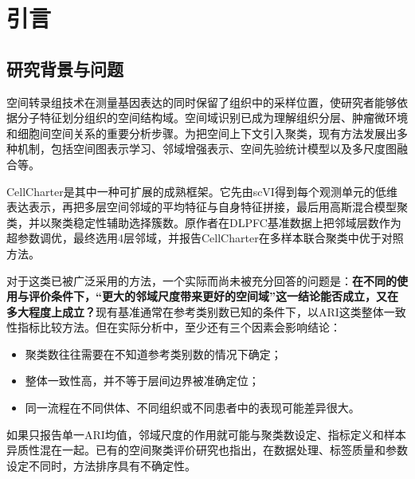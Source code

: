 \section{引言}
\label{sec:cc-intro-p1}

\subsection{研究背景与问题}
空间转录组技术在测量基因表达的同时保留了组织中的采样位置，使研究者能够依据分子特征划分组织的空间结构域。空间域识别已成为理解组织分层、肿瘤微环境和细胞间空间关系的重要分析步骤\cite{maynard2021,wu2021}。为把空间上下文引入聚类，现有方法发展出多种机制，包括空间图表示学习\cite{xu2024,dong2022stagate}、邻域增强表示\cite{singhal2024}、空间先验统计模型\cite{zhao2021}以及多尺度图融合\cite{zhang2025}等。

CellCharter是其中一种可扩展的成熟框架\cite{varrone2024}。它先由scVI得到每个观测单元的低维表达表示\cite{lopez2018}，再把多层空间邻域的平均特征与自身特征拼接，最后用高斯混合模型聚类，并以聚类稳定性辅助选择簇数。原作者在DLPFC基准数据上把邻域层数作为超参数调优，最终选用4层邻域，并报告CellCharter在多样本联合聚类中优于对照方法\cite{varrone2024,cellcharteranalyses2024}。

对于这类已被广泛采用的方法，一个实际而尚未被充分回答的问题是：\textbf{在不同的使用与评价条件下，“更大的邻域尺度带来更好的空间域”这一结论能否成立，又在多大程度上成立？}现有基准通常在参考类别数已知的条件下，以ARI这类整体一致性指标比较方法。但在实际分析中，至少还有三个因素会影响结论：
\begin{itemize}
  \item 聚类数往往需要在不知道参考类别数的情况下确定；
  \item 整体一致性高，并不等于层间边界被准确定位；
  \item 同一流程在不同供体、不同组织或不同患者中的表现可能差异很大。
\end{itemize}
如果只报告单一ARI均值，邻域尺度的作用就可能与聚类数设定、指标定义和样本异质性混在一起。已有的空间聚类评价研究也指出，在数据处理、标签质量和参数设定不同时，方法排序具有不确定性\cite{sun2026}。

